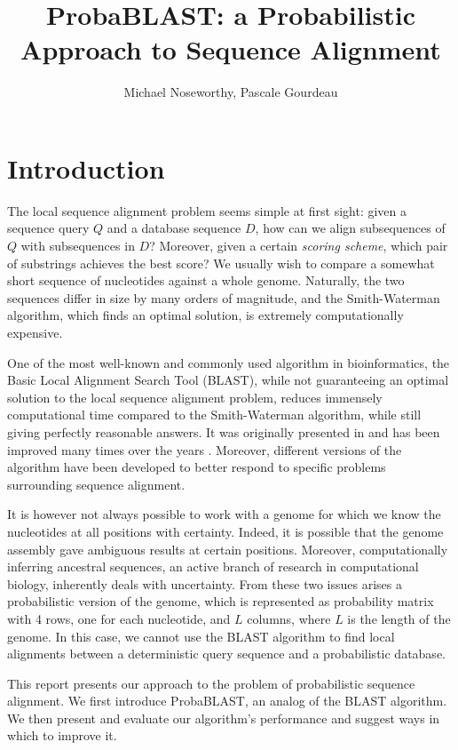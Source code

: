 \documentclass[12pt]{IEEEtran}
\begin{document}
\title{ProbaBLAST: a Probabilistic Approach to Sequence Alignment}
\author{Michael Noseworthy, Pascale Gourdeau}
\date{}
\maketitle

\section{Introduction}

The local sequence alignment problem seems simple at first sight: given a sequence query $Q$ and a database sequence $D$, how can we align subsequences of $Q$ with subsequences in $D$? Moreover, given a certain \emph{scoring scheme}, which pair of substrings achieves the best score? We usually wish to compare a somewhat short sequence of nucleotides against a whole genome. Naturally, the two sequences differ in size by many orders of magnitude, and the Smith-Waterman algorithm, which finds an optimal solution, is extremely computationally expensive. 

One of the most well-known and commonly used algorithm in bioinformatics, the Basic Local Alignment Search Tool (BLAST), while not guaranteeing an optimal solution to the local sequence alignment problem, reduces immensely computational time compared to the Smith-Waterman algorithm, while still giving perfectly reasonable answers. It was originally presented in \cite{originalBLAST} and has been improved many times over the years \cite{blast2}. Moreover, different versions of the algorithm have been developed to better respond to specific problems surrounding sequence alignment. 

It is however not always possible to work with a genome for which we know the nucleotides at all positions with certainty. Indeed, it is possible that the genome assembly gave ambiguous results at certain positions. Moreover, computationally inferring ancestral sequences, an active branch of research in computational biology, inherently deals with uncertainty. From these two issues arises a probabilistic version of the genome, which is represented as probability matrix with 4 rows, one for each nucleotide, and $L$ columns, where $L$ is the length of the genome. In this case, we cannot use the BLAST algorithm to find local alignments between a deterministic query sequence and a probabilistic database.

This report presents our approach to the problem of probabilistic sequence alignment. 
We first introduce ProbaBLAST, an analog of the BLAST algorithm. We then present and evaluate our algorithm's performance and suggest ways in which to improve it.
\end{document}
